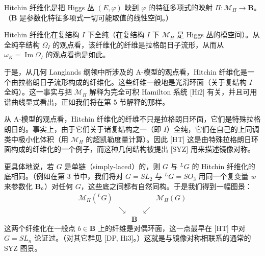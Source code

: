 \documentclass[11pt,a4paper]{article}
\begin{document}
Hitchin 纤维化是把 Higgs 丛 $(E,\varphi)$ 映到 $\varphi$ 的特征多项式的映射 $\Pi:\mathcal{M}_H\to\boldsymbol{B}$。（$\boldsymbol{B}$ 是参数化特征多项式一切可能取值的线性空间。）


Hitchin 纤维化在复结构 $I$ 下全纯（在复结构 $I$ 下 $\mathcal{M}_H$ 是 Higgs 丛的模空间）。从全纯辛结构 $\Omega_I$ 的观点看，该纤维化的纤维是拉格朗日子流形，从而从 $\omega_K=\operatorname{Im}\Omega_I$ 的观点看也是如此。

于是，从几何 Langlands 纲领中所涉及的 A-模型的观点看，Hitchin 纤维化是一个由拉格朗日子流形构成的纤维化。这些纤维一般地是光滑环面（关于复结构 $I$ 全纯）。这一事实与把 $\mathcal{M}_H$ 解释为完全可积 Hamilton 系统 [Hi2] 有关，并且可用谱曲线显式看出，正如我们将在第 5 节解释的那样。

从 A-模型的观点看，Hitchin 纤维化的纤维不只是拉格朗日环面，它们是特殊拉格朗日的。事实上，由于它们关于诸复结构之一（即 $I$）全纯，它们在自己的上同调类中极小化体积（用 $\mathcal{M}_H$ 的超凯勒度量计算）。因此 [HT] 这是由特殊拉格朗日环面构成的纤维化的一个例子，而这种几何结构被提出 [SYZ] 用来描述镜像对称。

更具体地说，若 $G$ 是单链（simply-laced）的，则 $G$ 与 ${}^{L}G$ 的 Hitchin 纤维化的底相同。（例如在第 3 节中，我们将对 $G=SL_2$ 与 ${}^{L}G=SO_3$ 用同一个复变量 $w$ 来参数化 $\boldsymbol{B}$。）对任何 $G$，这些底之间都有自然同构。于是我们得到一幅图景：
\begin{equation}\tag{2.2}
\begin{array}{ccccc}
\mathcal{M}_H({}^{L}G) & & & & \mathcal{M}_H(G)\\[2pt]
& \searrow & & \swarrow & \\[2pt]
& & \boldsymbol{B} & &
\end{array}
\end{equation}
这两个纤维化在一般点 $b\in\boldsymbol{B}$ 上的纤维是对偶环面，这一点最早在 [HT] 中对 $G=SL_n$ 论证过。（对其它群见 [DP, Hi3]。）这就是与镜像对称相联系的通常的 SYZ 图景。
\end{document}
